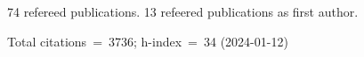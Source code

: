 74 refereed publications. 13 refeered publications as first author.

Total citations~=~3736; h-index~=~34 (2024-01-12)